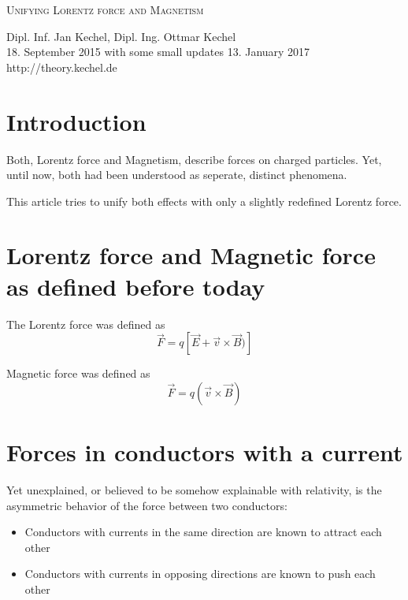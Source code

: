 \documentclass[12pt,a4paper,twocolumn]{article}
\begin{document}
%
%
\begin{titlepage}
\begin{center}
\vspace{1.5cm}

\Large \textsc{Unifying Lorentz force and Magnetism}

\vspace{6mm}

	\normalsize 
  Dipl. Inf. Jan Kechel, Dipl. Ing. Ottmar Kechel\\
	\vspace{6mm}
	18. September 2015 with some small updates 13. January 2017\\
	\vspace{6mm}
    http://theory.kechel.de
\end{center}

\vspace{1.5cm}
\tableofcontents
\end{titlepage}

\section{Introduction}
Both, Lorentz force and Magnetism, describe forces on charged particles. Yet, until now, both had been understood as seperate, distinct phenomena.

This article tries to unify both effects with only a slightly redefined Lorentz force.

\section{Lorentz force and Magnetic force as defined before today}
The Lorentz force was defined as $$\vec{F}=q[\vec{E}+\vec{v} \times \vec{B})]$$

Magnetic force was defined as $$\vec{F}=q(\vec{v} \times \vec{B})$$

\section{Forces in conductors with a current}

Yet unexplained, or believed to be somehow explainable with relativity, is the asymmetric behavior of the force between two conductors:
\begin{itemize}
  \item Conductors with currents in the same direction are known to attract each other
  \item Conductors with currents in opposing directions are known to push each other
\end{itemize}
\end{document}
